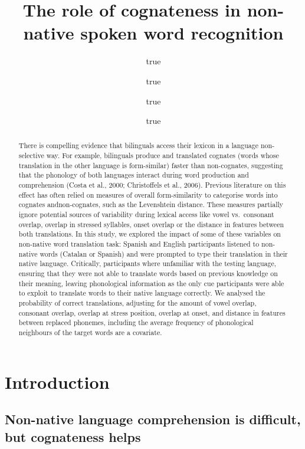 \documentclass[
  man]{apa6}
\title{The role of cognateness in non-native spoken word recognition}
\author{true \and true \and true \and true}
\date{}
\begin{document}
\maketitle
\begin{abstract}
There is compelling evidence that bilinguals access their lexicon in a
language non-selective way. For example, bilinguals produce and
translated cognates (words whose translation in the other language is
form-similar) faster than non-cognates, suggesting that the phonology of
both languages interact during word production and comprehension (Costa
et al., 2000; Christoffels et al., 2006). Previous literature on this
effect has often relied on measures of overall form-similarity to
categorise words into cognates andnon-cognates, such as the Levenshtein
distance. These measures partially ignore potential sources of
variability during lexical access like vowel vs.~consonant overlap,
overlap in stressed syllables, onset overlap or the distance in features
between both translations. In this study, we explored the impact of some
of these variables on non-native word translation task: Spanish and
English participants listened to non-native words (Catalan or Spanish)
and were prompted to type their translation in their native language.
Critically, participants where unfamiliar with the testing language,
ensuring that they were not able to translate words based on previous
knowledge on their meaning, leaving phonological information as the only
cue participants were able to exploit to translate words to their native
language correctly. We analysed the probability of correct translations,
adjusting for the amount of vowel overlap, consonant overlap, overlap at
stress position, overlap at onset, and distance in features between
replaced phonemes, including the average frequency of phonological
neighbours of the target words are a covariate.
\end{abstract}

\hypertarget{introduction}{%
\section{Introduction}\label{introduction}}

\hypertarget{non-native-language-comprehension-is-difficult-but-cognateness-helps}{%
\subsection{Non-native language comprehension is difficult, but
cognateness
helps}\label{non-native-language-comprehension-is-difficult-but-cognateness-helps}}
\end{document}
